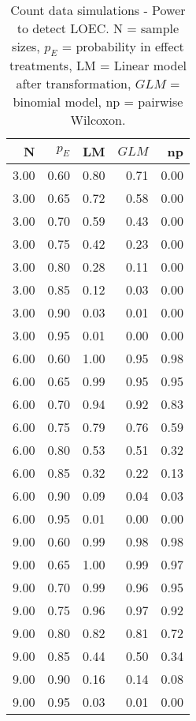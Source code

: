 \begin{table}[H]
\centering
\caption{Count data simulations - Power to detect LOEC. N = sample sizes, 
             $p_E$ = probability in effect treatments, LM = Linear model after transformation, 
             $GLM$ = binomial model, np = pairwise Wilcoxon.} 
\label{tab:pow_loec_p}
{\footnotesize
\begin{tabular}{rrrrr}
  \hline
N & $p_E$ & LM & $GLM$ & np \\ 
  \hline
3.00 & 0.60 & 0.80 & 0.71 & 0.00 \\ 
  3.00 & 0.65 & 0.72 & 0.58 & 0.00 \\ 
  3.00 & 0.70 & 0.59 & 0.43 & 0.00 \\ 
  3.00 & 0.75 & 0.42 & 0.23 & 0.00 \\ 
  3.00 & 0.80 & 0.28 & 0.11 & 0.00 \\ 
  3.00 & 0.85 & 0.12 & 0.03 & 0.00 \\ 
  3.00 & 0.90 & 0.03 & 0.01 & 0.00 \\ 
  3.00 & 0.95 & 0.01 & 0.00 & 0.00 \\ 
  6.00 & 0.60 & 1.00 & 0.95 & 0.98 \\ 
  6.00 & 0.65 & 0.99 & 0.95 & 0.95 \\ 
  6.00 & 0.70 & 0.94 & 0.92 & 0.83 \\ 
  6.00 & 0.75 & 0.79 & 0.76 & 0.59 \\ 
  6.00 & 0.80 & 0.53 & 0.51 & 0.32 \\ 
  6.00 & 0.85 & 0.32 & 0.22 & 0.13 \\ 
  6.00 & 0.90 & 0.09 & 0.04 & 0.03 \\ 
  6.00 & 0.95 & 0.01 & 0.00 & 0.00 \\ 
  9.00 & 0.60 & 0.99 & 0.98 & 0.98 \\ 
  9.00 & 0.65 & 1.00 & 0.99 & 0.97 \\ 
  9.00 & 0.70 & 0.99 & 0.96 & 0.95 \\ 
  9.00 & 0.75 & 0.96 & 0.97 & 0.92 \\ 
  9.00 & 0.80 & 0.82 & 0.81 & 0.72 \\ 
  9.00 & 0.85 & 0.44 & 0.50 & 0.34 \\ 
  9.00 & 0.90 & 0.16 & 0.14 & 0.08 \\ 
  9.00 & 0.95 & 0.03 & 0.01 & 0.00 \\ 
   \hline
\end{tabular}
}
\end{table}
